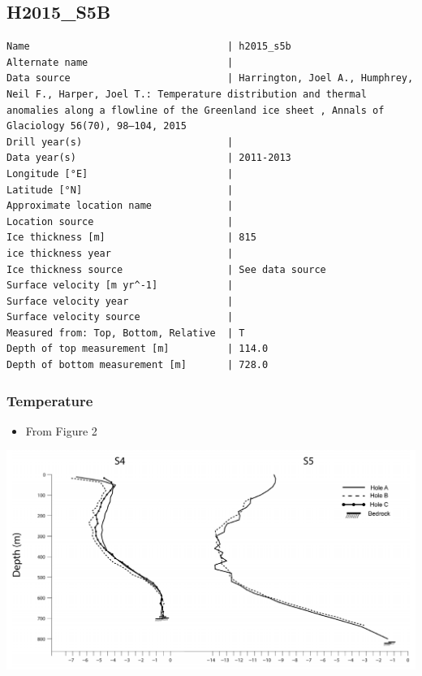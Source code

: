 \documentclass[article,a4paper,times,11pt,twoside]{article}
\begin{document}
\subsection{H2015\_S5B}
\label{sec:orgdda80e0}
\begin{verbatim}
Name                                  | h2015_s5b
Alternate name                        | 
Data source                           | Harrington, Joel A., Humphrey, Neil F., Harper, Joel T.: Temperature distribution and thermal anomalies along a flowline of the Greenland ice sheet , Annals of Glaciology 56(70), 98–104, 2015 
Drill year(s)                         | 
Data year(s)                          | 2011-2013
Longitude [°E]                        | 
Latitude [°N]                         | 
Approximate location name             | 
Location source                       | 
Ice thickness [m]                     | 815
ice thickness year                    | 
Ice thickness source                  | See data source
Surface velocity [m yr^-1]            | 
Surface velocity year                 | 
Surface velocity source               | 
Measured from: Top, Bottom, Relative  | T
Depth of top measurement [m]          | 114.0
Depth of bottom measurement [m]       | 728.0
\end{verbatim}

\subsubsection{Temperature}
\label{sec:orgfd4beaf}

\begin{itemize}
\item From \textcite{harrington_2015} Figure 2
\end{itemize}

\begin{center}
\includegraphics[width=.9\linewidth]{h2015_s5b/harrington_2015_fig2_S4_S5.png}
\end{center}
\end{document}
